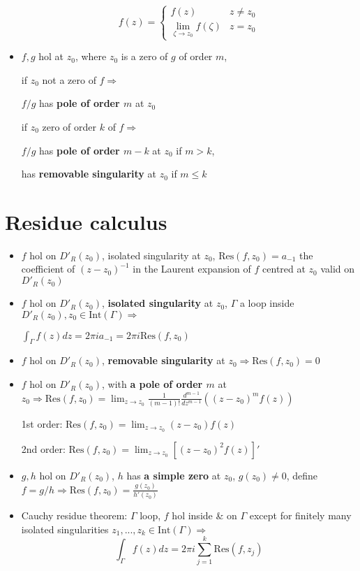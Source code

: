 \documentclass[10pt,a4paper]{article}
\begin{document}
\begin{multicols}{2}
\begin{itemize}
    $$f(z)=\begin{cases}
    f(z) & z\neq z_0 \\
    \lim_{\zeta \to z_0}f(\zeta) & z=z_0
    \end{cases}$$
  \item $f,g$ hol at $z_0$, where $z_0$ is a zero of $g$ of order $m$,
    
    if $z_0$ not a zero of $f \Rightarrow$
    
    $f/g$ has \textbf{pole of order $m$} at $z_0$
  
    if $z_0$ zero of order $k$ of $f \Rightarrow$ 
    
    $f/g$ has \textbf{pole of order $m-k$} at $z_0$ if $m>k$, 
    
    has \textbf{removable singularity} at $z_0$ if $m \leq k$
\end{itemize}

\section{Residue calculus}

\begin{itemize}
    \item $f$ hol on $D'_R(z_0)$, isolated singularity at $z_0$, $\text{Res}(f,z_0)=a_{-1}$ the coefficient of $(z-z_0)^{-1}$ in the Laurent expansion of $f$ centred at $z_0$ valid on $D'_R(z_0)$
  
    \item $f$ hol on $D'_R(z_0)$, \textbf{isolated singularity} at $z_0$, $\Gamma$ a loop inside $ D'_R(z_0), z_0 \in \text{Int}(\Gamma) \Rightarrow$
    
    $\int_\Gamma f(z)dz= 2\pi i a_{-1} = 2\pi i \text{Res}(f,z_0)$
      
    \item $f$ hol on $D'_R(z_0)$, \textbf{removable singularity} at $z_0 \Rightarrow \text{Res}(f,z_0)=0$
      
    \item $f$ hol on $D'_R(z_0)$, with \textbf{a pole of order $m$} at $\displaystyle z_0 \Rightarrow \text{Res}(f,z_0)= \lim_{z\to z_0} \frac{1}{(m-1)!} \frac{d^{m-1}}{dz^{m-1}} ((z-z_0)^m f(z))$
    
      1st order: $\text{Res}(f,z_0)= \lim_{z\to z_0} (z-z_0)f(z)$
    
      2nd order: $\text{Res}(f,z_0)= \lim_{z\to z_0} \left[ (z-z_0)^2f(z) \right]'$
    
    \item $g,h$ hol on $D'_R(z_0)$, $h$ has \textbf{a simple zero} at $z_0$, $g(z_0)\neq 0$, define $\displaystyle f=g/h \Rightarrow \text{Res}(f,z_0)=\frac{g(z_0)}{h'(z_0)}$
    \item Cauchy residue theorem: $\Gamma$ loop, $f$ hol inside \& on $\Gamma$ except for finitely many isolated singularities $\displaystyle z_1,...,z_k \in \text{Int}(\Gamma) \Rightarrow$
     $$\int_\Gamma f(z)dz = 2\pi i \sum_{j=1}^k \text{Res}(f,z_j)$$
    

\end{itemize}
\end{multicols}
\end{document}
